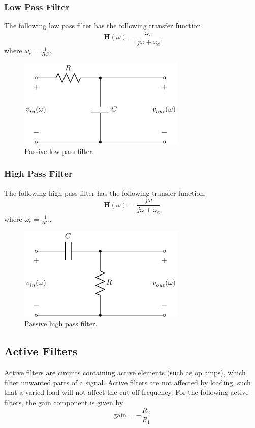 \documentclass{article}
\begin{document}
\subsubsection{Low Pass Filter}
The following low pass filter has the following transfer function.
\begin{equation*}
    \symbf{H}(\omega) = \frac{\omega_c}{j\omega + \omega_c}
\end{equation*}
where \(\displaystyle \omega_c = \frac{1}{RC}\).
\begin{figure}[H]
    \centering
    \includegraphics[width = 8cm, keepaspectratio = true]{figures/passive_low_pass_filter.pdf}
    \caption{Passive low pass filter.}
\end{figure}
\subsubsection{High Pass Filter}
The following high pass filter has the following transfer function.
\begin{equation*}
    \symbf{H}(\omega) = \frac{j\omega}{j\omega + \omega_c}
\end{equation*}
where \(\displaystyle \omega_c = \frac{1}{RC}\).
\begin{figure}[H]
    \centering
    \includegraphics[width = 8cm, keepaspectratio = true]{figures/passive_high_pass_filter.pdf}
    \caption{Passive high pass filter.}
\end{figure}
\subsection{Active Filters}
Active filters are circuits containing active elements (such as op
amps), which filter unwanted parts of a signal. Active filters are not
affected by loading, such that a varied load will not affect the
cut-off frequency. For the following active filters, the gain component
is given by
\begin{equation*}
    \mathrm{gain} = -\frac{R_2}{R_1}
\end{equation*}
\end{document}

